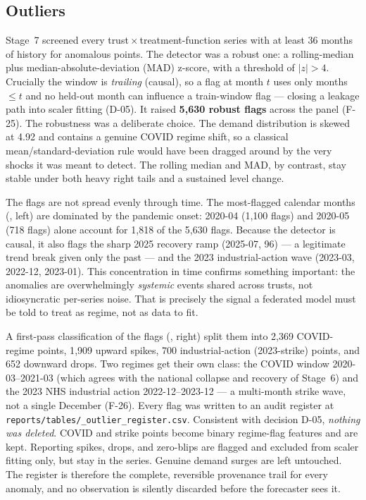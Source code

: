 \documentclass[11pt,a4paper]{article}
\begin{document}
\subsection{Outliers}\label{sec:outliers}

Stage~7 screened every trust\,$\times$\,treatment-function series with at least 36 months of history for anomalous points. The detector was a robust one: a rolling-median plus median-absolute-deviation (MAD) z-score, with a threshold of $|z|>4$. Crucially the window is \emph{trailing} (causal), so a flag at month $t$ uses only months $\le t$ and no held-out month can influence a train-window flag --- closing a leakage path into scaler fitting (D-05). It raised \textbf{5{,}630 robust flags} across the panel (F-25). The robustness was a deliberate choice. The demand distribution is skewed at 4.92 and contains a genuine COVID regime shift, so a classical mean/standard-deviation rule would have been dragged around by the very shocks it was meant to detect. The rolling median and MAD, by contrast, stay stable under both heavy right tails and a sustained level change.

The flags are not spread evenly through time. The most-flagged calendar months (, left) are dominated by the pandemic onset: 2020-04 (1{,}100 flags) and 2020-05 (718 flags) alone account for 1{,}818 of the 5{,}630 flags. Because the detector is causal, it also flags the sharp 2025 recovery ramp (2025-07, 96) --- a legitimate trend break given only the past --- and the 2023 industrial-action wave (2023-03, 2022-12, 2023-01). This concentration in time confirms something important: the anomalies are overwhelmingly \emph{systemic} events shared across trusts, not idiosyncratic per-series noise. That is precisely the signal a federated model must be told to treat as regime, not as data to fit.

A first-pass classification of the flags (, right) split them into 2{,}369 COVID-regime points, 1{,}909 upward spikes, 700 industrial-action (2023-strike) points, and 652 downward drops. Two regimes get their own class: the COVID window 2020-03--2021-03 (which agrees with the national collapse and recovery of Stage~6) and the 2023 NHS industrial action 2022-12--2023-12 --- a multi-month strike wave, not a single December (F-26). Every flag was written to an audit register at \texttt{reports/\allowbreak tables/\_outlier\_register.csv}. Consistent with decision D-05, \emph{nothing was deleted}. COVID and strike points become binary regime-flag features and are kept. Reporting spikes, drops, and zero-blips are flagged and excluded from scaler fitting only, but stay in the series. Genuine demand surges are left untouched. The register is therefore the complete, reversible provenance trail for every anomaly, and no observation is silently discarded before the forecaster sees it.
\end{document}

